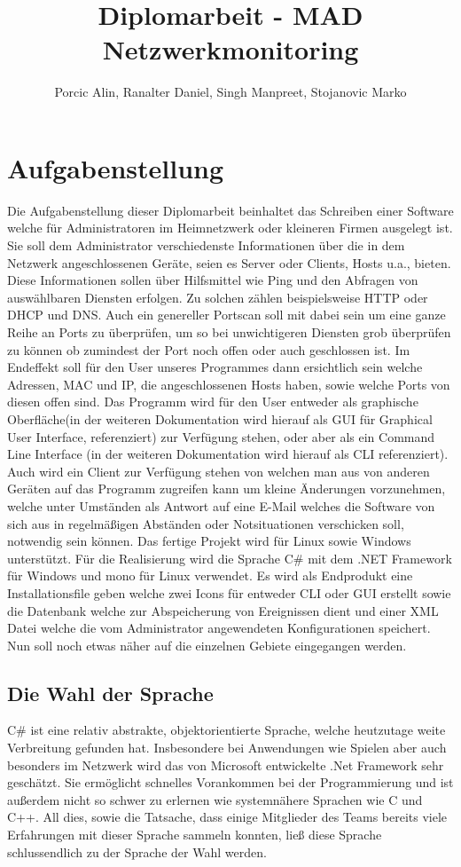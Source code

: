 \documentclass[10pt,a4paper]{report}
\title{Diplomarbeit - MAD Netzwerkmonitoring}
\author{Porcic Alin, Ranalter Daniel, Singh Manpreet, Stojanovic Marko}
\begin{document}
\maketitle
\chapter{Aufgabenstellung}
Die Aufgabenstellung dieser Diplomarbeit beinhaltet das Schreiben einer Software welche für Administratoren im Heimnetzwerk oder kleineren Firmen ausgelegt ist. Sie soll dem Administrator verschiedenste Informationen über die in dem Netzwerk angeschlossenen Geräte, seien es Server oder Clients, Hosts u.a., bieten. Diese Informationen sollen über Hilfsmittel wie Ping und den Abfragen von auswählbaren Diensten erfolgen. Zu solchen zählen beispielsweise HTTP oder DHCP und DNS. Auch ein genereller Portscan soll mit dabei sein um eine ganze Reihe an Ports zu überprüfen, um so bei unwichtigeren Diensten grob überprüfen zu können ob zumindest der Port noch offen oder auch geschlossen ist. Im Endeffekt soll für den User unseres Programmes dann ersichtlich sein welche Adressen, MAC und IP, die angeschlossenen Hosts haben, sowie welche Ports von diesen offen sind. Das Programm wird für den User entweder als graphische Oberfläche(in der weiteren Dokumentation wird hierauf als GUI für Graphical User Interface, referenziert) zur Verfügung stehen, oder aber als ein Command Line Interface (in der weiteren Dokumentation wird hierauf als CLI referenziert). Auch wird ein Client zur Verfügung stehen von welchen man aus von anderen Geräten auf das Programm zugreifen kann um kleine Änderungen vorzunehmen, welche unter Umständen als Antwort auf eine E-Mail welches die Software von sich aus in regelmäßigen Abständen oder Notsituationen verschicken soll, notwendig sein können. Das fertige Projekt wird für Linux sowie Windows unterstützt. Für die Realisierung wird die Sprache C\# mit dem .NET Framework für Windows und mono für Linux verwendet. Es wird als Endprodukt eine Installationsfile geben welche zwei Icons für entweder CLI oder GUI erstellt sowie die Datenbank welche zur Abspeicherung von Ereignissen dient und einer XML Datei welche die vom Administrator angewendeten Konfigurationen speichert. Nun soll noch etwas näher auf die einzelnen Gebiete eingegangen werden.
\section{Die Wahl der Sprache}
C\# ist eine relativ abstrakte, objektorientierte Sprache, welche heutzutage weite Verbreitung gefunden hat. Insbesondere bei Anwendungen wie Spielen aber auch besonders im Netzwerk wird das von Microsoft entwickelte .Net Framework sehr geschätzt. Sie ermöglicht schnelles Vorankommen bei der Programmierung und ist außerdem nicht so schwer zu erlernen wie systemnähere Sprachen wie C und C++. All dies, sowie die Tatsache, dass einige Mitglieder des Teams bereits viele Erfahrungen mit dieser Sprache sammeln konnten, ließ diese Sprache schlussendlich zu der Sprache der Wahl werden. 
\end{document}
